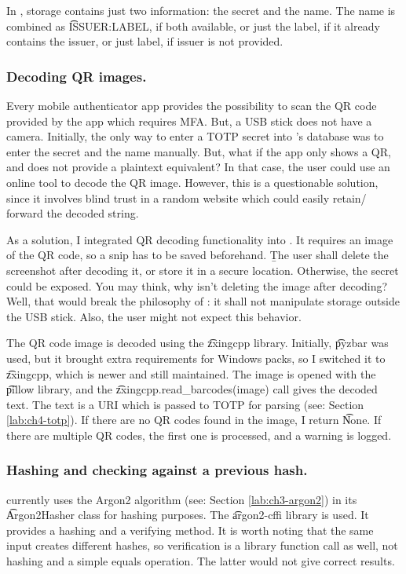 In \app{}, storage contains just two information: the secret and the name.
The name is combined as \t{ISSUER:LABEL}, if both available, or just the label, if it already contains the issuer, or just label, if issuer is not provided.


\subsubsection{Decoding QR images.}

Every mobile authenticator app provides the possibility to scan the QR code provided by the app which requires MFA.
But, a USB stick does not have a camera.
Initially, the only way to enter a TOTP secret into \app's database was to enter the secret and the name manually.
But, what if the app only shows a QR, and does not provide a plaintext equivalent?
In that case, the user could use an online tool to decode the QR image.
However, this is a questionable solution, since it involves blind trust in a random website which could easily retain/ forward the decoded string.

As a solution, I integrated QR decoding functionality into \app{}.
It requires an image of the QR code, so a snip has to be saved beforehand.
\b{The user shall delete the screenshot after decoding it, or store it in a secure location.}
Otherwise, the secret could be exposed.
You may think, why isn't \app{} deleting the image after decoding?
Well, that would break the philosophy of \app{}: it shall not manipulate storage outside the USB stick.
Also, the user might not expect this behavior.

The QR code image is decoded using the \t{zxingcpp} library.
Initially, \t{pyzbar} was used, but it brought extra requirements for Windows packs, so I switched it to \t{zxingcpp}, which is newer and still maintained.
The image is opened with the \t{pillow} library, and the \t{zxingcpp.read\_barcodes(image)} call gives the decoded text.
The text is a URI which is passed to TOTP for parsing (see: Section \ref{lab:ch4-totp}).
If there are no QR codes found in the image, I return \t{None}.
If there are multiple QR codes, the first one is processed, and a warning is logged.


\subsubsection{Hashing and checking against a previous hash.} \label{lab:ch4-hasher}

\app{} currently uses the Argon2 algorithm (see: Section \ref{lab:ch3-argon2}) in its \t{Argon2Hasher} class for hashing purposes.
The \t{argon2-cffi} library is used.
It provides a hashing and a verifying method.
It is worth noting that the same input creates different hashes, so verification is a library function call as well, not hashing and a simple equals operation.
The latter would not give correct results.


